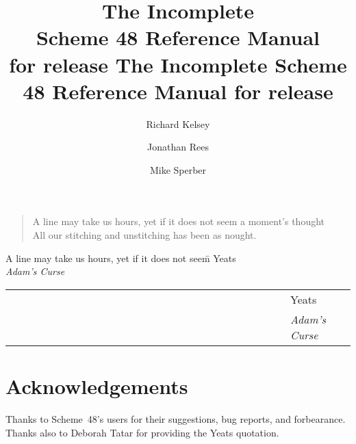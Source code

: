 \documentclass[twoside]{report}
\begin{document}
\frontmatter
\label{top_node}

\texonly
\title{{\large The Incomplete} \\ Scheme 48 Reference Manual \\
 {\large for release }}
\endtexonly
\htmlonly
\title{The Incomplete Scheme 48 Reference Manual for release }
\endhtmlonly
\author{Richard Kelsey \and Jonathan Rees \and Mike Sperber}
\date{}

\maketitle

\begin{verse}
A line may take us hours, yet if it does not seem a moment's thought \\
All our stitching and unstitching has been as nought.
\end{verse}
\texonly
\begin{tabbing}
A line may take us hours, yet if it does not seem\= \kill
\> Yeats \\
\> {\em Adam's Curse}
\end{tabbing}
\endtexonly
\htmlonly
\begin{tabular}{ll}
~~~~~~~~~~~~~~~~~~~~~~~~~~~~~~~~~~~~~~~~~~~~~~~~~ & Yeats \\
& {\em Adam's Curse}
\end{tabular}
\endhtmlonly

\chapter*{Acknowledgements}

Thanks to Scheme~48's users for their suggestions, bug reports,
  and forbearance.
Thanks also to Deborah Tatar for providing the Yeats quotation.

\tableofcontents

\texonly
\cleardoublepage{}\setcounter{page}{1}
\endtexonly

\mainmatter











\backmatter
\printindex
\end{document}
